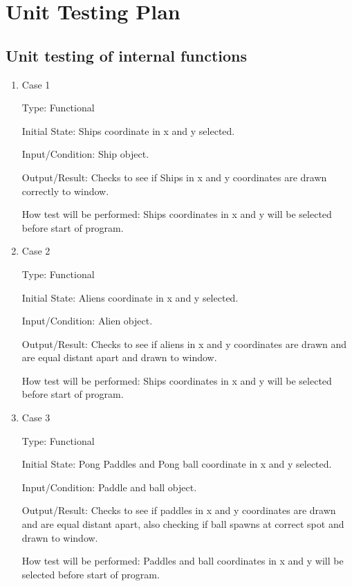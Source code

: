 \documentclass[12pt, titlepage]{article}
\begin{document}
\section{Unit Testing Plan}
		
\subsection{Unit testing of internal functions}

\begin{enumerate}

\item{Case 1\\}

Type: Functional

Initial State: Ships coordinate in x and y selected.

Input/Condition: Ship object.

Output/Result: Checks to see if Ships in x and y coordinates are drawn correctly to window.

How test will be performed: Ships coordinates in x and y will be selected before start of program.

\item{Case 2\\}

Type: Functional

Initial State: Aliens coordinate in x and y selected.

Input/Condition: Alien object.

Output/Result: Checks to see if aliens in x and y coordinates are drawn and are equal distant apart and drawn to window.

How test will be performed: Ships coordinates in x and y will be selected before start of program.

\item{Case 3\\}

Type: Functional

Initial State: Pong Paddles and Pong ball coordinate in x and y selected.

Input/Condition: Paddle and ball object.

Output/Result: Checks to see if paddles in x and y coordinates are drawn and are equal distant apart, also checking if ball spawns at correct spot and drawn to window.

How test will be performed: Paddles and ball coordinates in x and y will be selected before start of program.


\end{enumerate}
\end{document}
